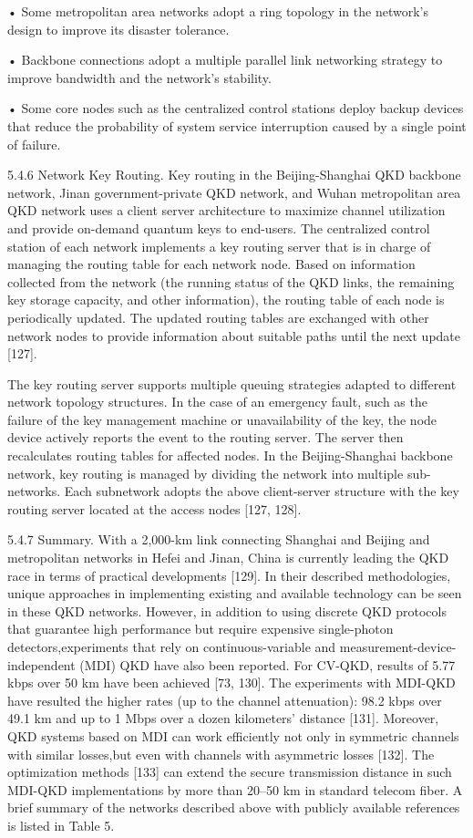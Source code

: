 • Some metropolitan area networks adopt a ring topology in the network’s design to improve its disaster tolerance.

• Backbone connections adopt a multiple parallel link networking strategy to improve bandwidth and the network’s stability.

• Some core nodes such as the centralized control stations deploy backup devices that reduce the probability of system service interruption caused by a single point of failure.

5.4.6 Network Key Routing. Key routing in the Beijing-Shanghai QKD backbone network, Jinan government-private QKD network, and Wuhan metropolitan area QKD network uses a client server architecture to maximize channel utilization and provide on-demand quantum keys to end-users.
The centralized control station of each network implements a key routing server that is in charge of managing the routing table for each network node. Based on information collected from the network (the running status of the QKD links, the remaining key storage capacity, and other information), the routing table of each node is periodically updated. The updated routing tables are exchanged with other network nodes to provide information about suitable paths until the next update [127].

The key routing server supports multiple queuing strategies adapted to different network topology structures. In the case of an emergency fault, such as the failure of the key management machine or unavailability of the key, the node device actively reports the event to the routing server.
The server then recalculates routing tables for affected nodes. In the Beijing-Shanghai backbone network, key routing is managed by dividing the network into multiple sub-networks. Each subnetwork adopts the above client-server structure with the key routing server located at the access nodes [127, 128].

5.4.7 Summary. With a 2,000-km link connecting Shanghai and Beijing and metropolitan networks in Hefei and Jinan, China is currently leading the QKD race in terms of practical developments [129]. In their described methodologies, unique approaches in implementing existing and available technology can be seen in these QKD networks. However, in addition to using discrete QKD protocols that guarantee high performance but require expensive single-photon detectors,experiments that rely on continuous-variable and measurement-device-independent (MDI) QKD have also been reported. For CV-QKD, results of 5.77 kbps over 50 km have been achieved [73, 130]. The experiments with MDI-QKD have resulted the higher rates (up to the channel attenuation): 98.2 kbps over 49.1 km and up to 1 Mbps over a dozen kilometers’ distance [131]. Moreover, QKD systems based on MDI can work efficiently not only in symmetric channels with similar losses,but even with channels with asymmetric losses [132]. The optimization methods [133] can extend the secure transmission distance in such MDI-QKD implementations by more than 20–50 km in standard telecom fiber. A brief summary of the networks described above with publicly available references is listed in Table 5.

